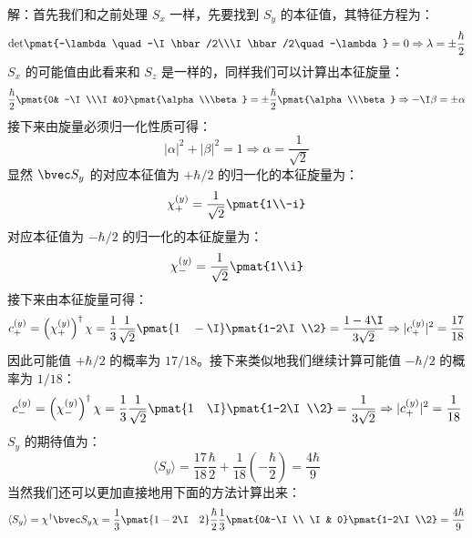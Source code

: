 \begin{example}{}
解：首先我们和之前处理 $S_x$ 一样，先要找到 $S_y$ 的本征值，其特征方程为：
\begin{equation}
\rm{det}\pmat{-\lambda \quad -\I\hbar/2\\\I\hbar/2\quad -\lambda}=0\Rightarrow\lambda=\pm\frac{\hbar}{2}
\end{equation}
$S_x$ 的可能值由此看来和 $S_z$ 是一样的，同样我们可以计算出本征旋量：
\begin{equation}
\frac{\hbar}{2}\pmat{0& -\I\\\I&0}\pmat{\alpha\\\beta}=\pm\frac{\hbar}{2}\pmat{\alpha\\\beta} \Rightarrow -\I\beta=\pm\alpha
\end{equation}
接下来由旋量必须归一化性质可得：
\begin{equation}
|\alpha|^2+|\beta|^2=1\Rightarrow\alpha=\frac{1}{\sqrt{2}}
\end{equation}
显然 $\bvec S_y$ 的对应本征值为 $+\hbar/2$ 的归一化的本征旋量为：
\begin{equation}
\chi_+^{(y)}=\frac{1}{\sqrt{2}}\pmat{1\\-i}
\end{equation}
对应本征值为 $-\hbar/2$ 的归一化的本征旋量为：
\begin{equation}
\chi_-^{(y)}=\frac{1}{\sqrt{2}}\pmat{1\\i}
\end{equation}
接下来由本征旋量可得：
\begin{equation}
c_+^{(y)}=\left(\chi_+^{(y)}\right)^\dagger\chi=\frac{1}{3}\frac{1}{\sqrt{2}}\pmat{1\quad -\I}\pmat{1-2\I\\2}=\frac{1-4\I}{3\sqrt{2}}\Rightarrow |c_+^{(y)}|^2=\frac{17}{18}
\end{equation}
因此可能值 $+\hbar/2$ 的概率为 $17/18$。接下来类似地我们继续计算可能值 $-\hbar/2$ 的概率为 $1/18$：
\begin{equation}
c_-^{(y)}=\left(\chi_-^{(y)}\right)^\dagger\chi=\frac{1}{3}\frac{1}{\sqrt{2}}\pmat{1\quad \I}\pmat{1-2\I\\2}=\frac{1}{3\sqrt{2}}\Rightarrow |c_+^{(y)}|^2=\frac{1}{18}
\end{equation}
$S_y$ 的期待值为：
\begin{equation}
\langle S_y \rangle =\frac{17}{18}\frac{\hbar}{2}+\frac{1}{18}\left(-\frac{\hbar}{2}\right)=\frac{4\hbar}{9}
\end{equation}
当然我们还可以更加直接地用下面的方法计算出来：
\begin{equation}
\langle S_y \rangle = \chi^\dagger\bvec S_y\chi = \frac{1}{3}\pmat{1-2\I\quad 2}\frac{\hbar}{2}\frac{1}{3}\pmat{0&-\I\\ \I& 0}\pmat{1-2\I\\2}=\frac{4\hbar}{9}
\end{equation}

\end{example}

